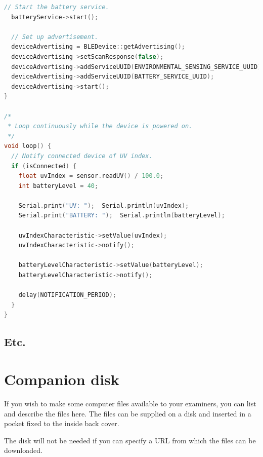 \documentclass[12pt,openany,a4paper]{book}
\begin{document}
\begin{lstlisting}[basicstyle=\ttfamily,breaklines=true,language=c++]
  // Start the battery service.
  batteryService->start();

  // Set up advertisement.
  deviceAdvertising = BLEDevice::getAdvertising();
  deviceAdvertising->setScanResponse(false);
  deviceAdvertising->addServiceUUID(ENVIRONMENTAL_SENSING_SERVICE_UUID);
  deviceAdvertising->addServiceUUID(BATTERY_SERVICE_UUID);
  deviceAdvertising->start();
}

/*
 * Loop continuously while the device is powered on.
 */
void loop() {
  // Notify connected device of UV index.
  if (isConnected) {
    float uvIndex = sensor.readUV() / 100.0;
    int batteryLevel = 40;

    Serial.print("UV: ");  Serial.println(uvIndex);
    Serial.print("BATTERY: ");  Serial.println(batteryLevel);
    
    uvIndexCharacteristic->setValue(uvIndex);
    uvIndexCharacteristic->notify();

    batteryLevelCharacteristic->setValue(batteryLevel);
    batteryLevelCharacteristic->notify();
    
    delay(NOTIFICATION_PERIOD);
  }
}
\end{lstlisting}

\section{Etc.}

\chapter{Companion disk}

If you wish to make some computer files available to your examiners,
you can list and describe the files here.  The files can be supplied
on a disk and inserted in a pocket fixed to the inside back cover.

The disk will not be needed if you can specify a URL from which the
files can be downloaded.

\cleardoublepage




\end{document}
